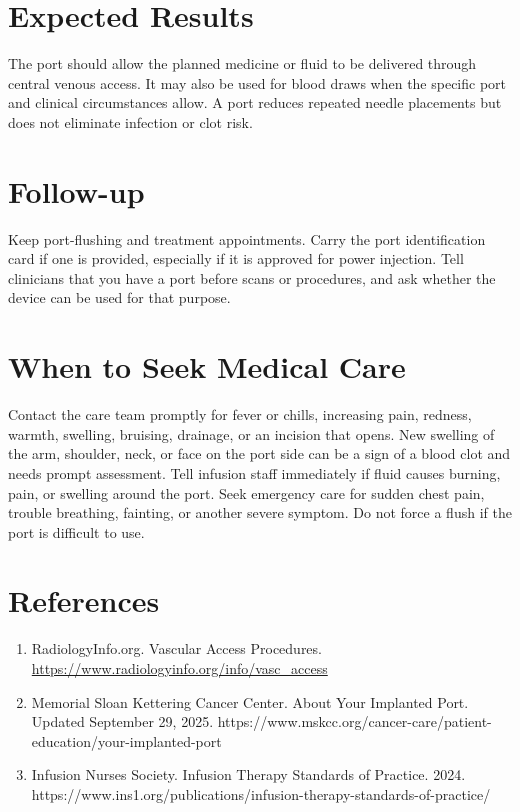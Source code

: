 \section*{Expected Results}
The port should allow the planned medicine or fluid to be delivered through central venous access. It may also be used for blood draws when the specific port and clinical circumstances allow. A port reduces repeated needle placements but does not eliminate infection or clot risk.

\section*{Follow-up}
Keep port-flushing and treatment appointments. Carry the port identification card if one is provided, especially if it is approved for power injection. Tell clinicians that you have a port before scans or procedures, and ask whether the device can be used for that purpose.

\section*{When to Seek Medical Care}
Contact the care team promptly for fever or chills, increasing pain, redness, warmth, swelling, bruising, drainage, or an incision that opens. New swelling of the arm, shoulder, neck, or face on the port side can be a sign of a blood clot and needs prompt assessment. Tell infusion staff immediately if fluid causes burning, pain, or swelling around the port. Seek emergency care for sudden chest pain, trouble breathing, fainting, or another severe symptom. Do not force a flush if the port is difficult to use.

\section*{References}
\begin{enumerate}
  \item RadiologyInfo.org. Vascular Access Procedures. \url{https://www.radiologyinfo.org/info/vasc_access}
  \item Memorial Sloan Kettering Cancer Center. About Your Implanted Port. Updated September 29, 2025. https://www.mskcc.org/cancer-care/patient-education/your-implanted-port
  \item Infusion Nurses Society. Infusion Therapy Standards of Practice. 2024. https://www.ins1.org/publications/infusion-therapy-standards-of-practice/
\end{enumerate}

\clearpage
